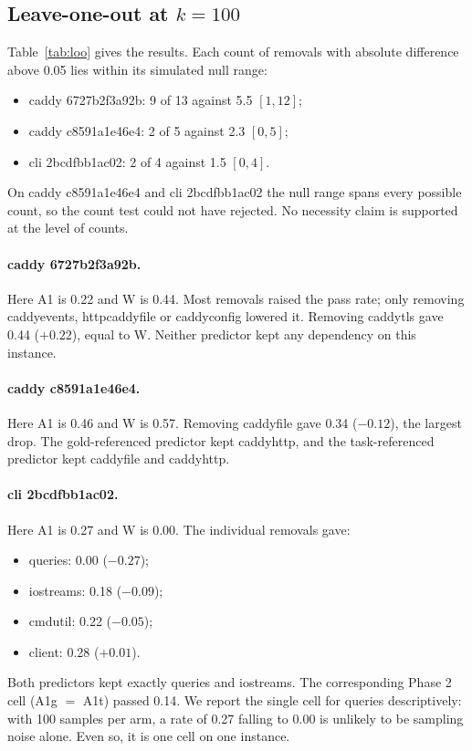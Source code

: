 \subsection{Leave-one-out at $k=100$}

Table~\ref{tab:loo} gives the results. Each count of removals with absolute difference above 0.05 lies within its simulated null range:
\begin{itemize}
\item caddy 6727b2f3a92b: 9 of 13 against 5.5 $[1, 12]$;
\item caddy c8591a1e46e4: 2 of 5 against 2.3 $[0, 5]$;
\item cli 2bcdfbb1ac02: 2 of 4 against 1.5 $[0, 4]$.
\end{itemize}
On caddy c8591a1e46e4 and cli 2bcdfbb1ac02 the null range spans every possible count, so the count test could not have rejected. No necessity claim is supported at the level of counts.

\paragraph{caddy 6727b2f3a92b.} Here A1 is 0.22 and W is 0.44. Most removals raised the pass rate; only removing caddyevents, httpcaddyfile or caddyconfig lowered it. Removing caddytls gave 0.44 ($+0.22$), equal to W. Neither predictor kept any dependency on this instance.

\paragraph{caddy c8591a1e46e4.} Here A1 is 0.46 and W is 0.57. Removing caddyfile gave 0.34 ($-0.12$), the largest drop. The gold-referenced predictor kept caddyhttp, and the task-referenced predictor kept caddyfile and caddyhttp.

\paragraph{cli 2bcdfbb1ac02.} Here A1 is 0.27 and W is 0.00. The individual removals gave:
\begin{itemize}
\item queries: 0.00 ($-0.27$);
\item iostreams: 0.18 ($-0.09$);
\item cmdutil: 0.22 ($-0.05$);
\item client: 0.28 ($+0.01$).
\end{itemize}
Both predictors kept exactly queries and iostreams. The corresponding Phase 2 cell (A1g $=$ A1t) passed 0.14. We report the single cell for queries descriptively: with 100 samples per arm, a rate of 0.27 falling to 0.00 is unlikely to be sampling noise alone. Even so, it is one cell on one instance.

